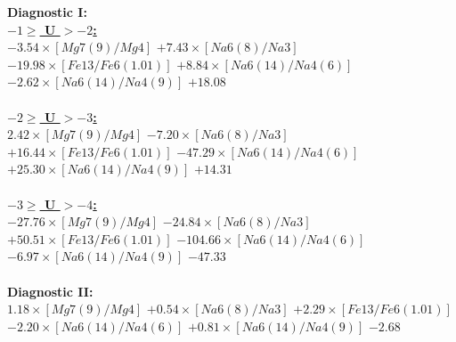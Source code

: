 \documentclass[12pt]{article}
\newcommand\tab[1][1cm]{\hspace*{#1}}
\begin{document}
\textbf{Diagnostic I:}
\\
\tab[0.6cm]\underline{\textbf{$-1 \geq$ U $> -2$:}}
\\
\tab[0.6cm]$-3.54 \times [Mg7(9)/Mg4]$ $+ 7.43 \times [Na6(8)/Na3]$ $- 19.98 \times [Fe13/Fe6(1.01)]$ \tab[0.6cm]$+ 8.84 \times [Na6(14)/Na4(6)]$ $- 2.62 \times [Na6(14)/Na4(9)]$ $+ 18.08 $
\\
\\
\tab[0.6cm]\underline{\textbf{$-2 \geq$ U $> -3$:}}
\\
\tab[0.6cm]$2.42 \times [Mg7(9)/Mg4]$ $- 7.20 \times [Na6(8)/Na3]$ $+ 16.44 \times [Fe13/Fe6(1.01)]$ \tab[0.6cm]$-47.29 \times [Na6(14)/Na4(6)] $ $+ 25.30 \times [Na6(14)/Na4(9)]$ $+ 14.31$
\\
\\
\tab[0.6cm]\underline{\textbf{$-3 \geq$ U $> -4$:}}
\\
\tab[0.6cm]$-27.76 \times [Mg7(9)/Mg4]$ $ - 24.84 \times[Na6(8)/Na3]$ $+ 50.51 \times [Fe13/Fe6(1.01)]$ \tab[0.6cm]$- 104.66 \times [Na6(14)/Na4(6)]$ $-6.97 \times [Na6(14)/Na4(9)]$ $- 47.33$
\\
\\
\tab[0.6cm]\textbf{Diagnostic II:}
\\
\tab[0.6cm]$1.18 \times [Mg7(9)/Mg4]$ $+0.54 \times [Na6(8)/Na3]$ $+2.29 \times [Fe13/Fe6(1.01)]$ \tab[0.6cm]$- 2.20 \times [Na6(14)/Na4(6)]$ $+ 0.81 \times[Na6(14)/Na4(9)]$ $-2.68$ 
\end{document}
